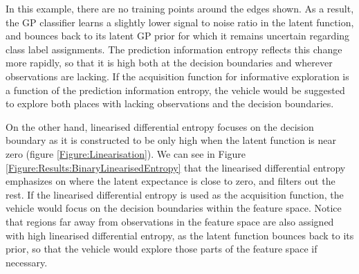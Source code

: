 \documentclass{article}
\begin{document}
		In this example, there are no training points around the edges shown. As a result, the GP classifier learns a slightly lower signal to noise ratio in the latent function, and bounces back to its latent GP prior for which it remains uncertain regarding class label assignments. The prediction information entropy reflects this change more rapidly, so that it is high both at the decision boundaries and wherever observations are lacking. If the acquisition function for informative exploration is a function of the prediction information entropy, the vehicle would be suggested to explore both places with lacking observations and the decision boundaries. 
		
		On the other hand, linearised differential entropy focuses on the decision boundary as it is constructed to be only high when the latent function is near zero (figure \ref{Figure:Linearisation}). We can see in Figure \ref{Figure:Results:BinaryLinearisedEntropy} that the linearised differential entropy emphasizes on where the latent expectance is close to zero, and filters out the rest. If the linearised differential entropy is used as the acquisition function, the vehicle would focus on the decision boundaries within the feature space. Notice that regions far away from observations in the feature space are also assigned with high linearised differential entropy, as the latent function bounces back to its prior, so that the vehicle would explore those parts of the feature space if necessary.
		
		
%		
		
\end{document}
